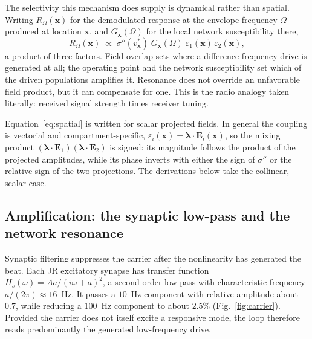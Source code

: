 \documentclass[11pt,a4paper]{article}
\newcommand{\Sig}{\sigma}
\begin{document}
The selectivity this mechanism does supply is dynamical rather than spatial. Writing
$R_\Omega(\mathbf{x})$ for the demodulated response at the envelope frequency $\Omega$
produced at location $\mathbf{x}$, and $G_{\mathbf{x}}(\Omega)$ for the local network
susceptibility there,
\begin{equation}
R_\Omega(\mathbf{x})\;\propto\;\Sig''(v^*_{\mathbf{x}})\;G_{\mathbf{x}}(\Omega)\;
\varepsilon_1(\mathbf{x})\,\varepsilon_2(\mathbf{x}),
\label{eq:spatial}
\end{equation}
a product of three factors. Field overlap sets where a difference-frequency drive is
generated at all; the operating point and the network susceptibility set which of the
driven populations amplifies it. Resonance does not override an unfavorable field
product, but it can compensate for one. This is the radio analogy taken literally:
received signal strength times receiver tuning.

Equation~\eqref{eq:spatial} is written for scalar projected fields. In general the
coupling is vectorial and compartment-specific,
$\varepsilon_i(\mathbf{x})=\boldsymbol{\lambda}\!\cdot\!\mathbf{E}_i(\mathbf{x})$, so the
mixing product $(\boldsymbol{\lambda}\!\cdot\!\mathbf{E}_1)
(\boldsymbol{\lambda}\!\cdot\!\mathbf{E}_2)$ is signed: its magnitude follows the product
of the projected amplitudes, while its phase inverts with either the sign of $\Sig''$ or
the relative sign of the two projections. The derivations below take the collinear,
scalar case.

\subsection{Amplification: the synaptic low-pass and the network resonance}\label{sec:carrier}
Synaptic filtering suppresses the carrier after the nonlinearity has generated
the beat. Each JR excitatory synapse has transfer function
$H_s(\omega)=Aa/(i\omega+a)^2$, a second-order low-pass with characteristic
frequency $a/(2\pi)\approx16$~Hz. It passes a $10$~Hz component with relative
amplitude about $0.7$, while reducing a $100$~Hz component to about $2.5\%$
(Fig.~\ref{fig:carrier}). Provided the carrier does not itself excite a responsive
mode, the loop therefore reads predominantly the generated low-frequency drive.


\end{document}
